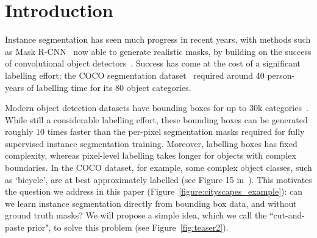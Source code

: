 \documentclass[runningheads]{llncs}
\begin{document}
\vspace{-2mm}
\section{Introduction}

Instance segmentation has seen much progress in recent years, with methods such as Mask R-CNN~\cite{he2017mask} now able to generate realistic masks, by building on the success of convolutional object detectors~\cite{ren2015faster,huang2016speed}.
Success has come at the cost of a significant labelling effort; the COCO segmentation dataset~\cite{lin2014microsoft} required around 40 person-years of labelling time for its 80 object categories.  

Modern object detection datasets have bounding boxes for up to 30k categories~\cite{krishna2017visual}. While still a considerable labelling effort, these bounding boxes can be generated roughly 10 times faster than the per-pixel segmentation masks required for fully supervised instance segmentation training. 
Moreover, labelling boxes has fixed complexity, whereas pixel-level labelling takes longer for objects with complex boundaries. In the COCO dataset,
for example, some complex object classes, such as `bicycle', are at best approximately labelled (see Figure 15 in~\cite{lin2014microsoft}). This motivates the question we address in this paper (Figure~\ref{figure:cityscapes_example}): can we learn instance
segmentation directly from bounding box data, and without ground truth masks?  We will propose a simple idea, which we call the ``cut-and-paste prior", to solve this problem (see Figure~\ref{fig:teaser2}). 

\end{document}
